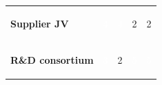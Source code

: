 \documentclass[10pt,a4paper]{article}
\begin{document}
{\begin{tabular}{p{38mm}>{\centering\arraybackslash}p{21mm}>{\centering\arraybackslash}p{21mm}>{\centering\arraybackslash}p{21mm}>{\centering\arraybackslash}p{21mm}}
{\bfseries Supplier JV} & \colorbox{BOGreen}{\textcolor{white}{\strut\hspace{5pt}4\hspace{5pt}}} & \colorbox{BOGreen}{\textcolor{white}{\strut\hspace{5pt}4\hspace{5pt}}} & \colorbox{BOLight}{\textcolor{BOText}{\strut\hspace{5pt}2\hspace{5pt}}} & \colorbox{BOLight}{\textcolor{BOText}{\strut\hspace{5pt}2\hspace{5pt}}} \\
{\bfseries R\&D consortium} & \colorbox{BOBlue}{\textcolor{white}{\strut\hspace{5pt}3\hspace{5pt}}} & \colorbox{BOLight}{\textcolor{BOText}{\strut\hspace{5pt}2\hspace{5pt}}} & \colorbox{BOGreen}{\textcolor{white}{\strut\hspace{5pt}5\hspace{5pt}}} & \colorbox{BOGreen}{\textcolor{white}{\strut\hspace{5pt}5\hspace{5pt}}} \\
\end{tabular}}\par\vspace{2pt}
\end{document}
